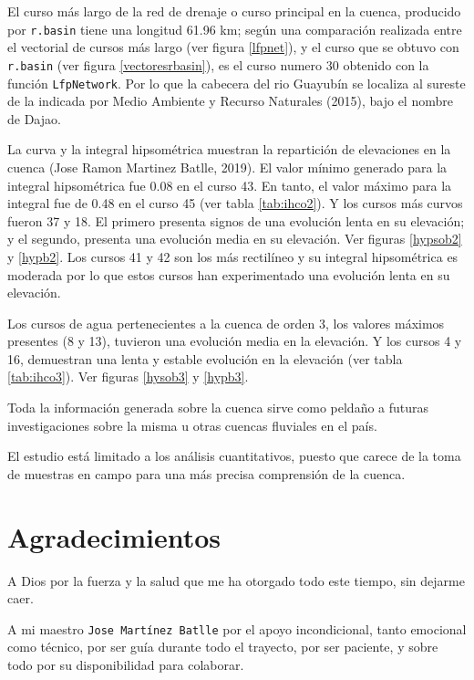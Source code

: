 \documentclass[11pt,]{article}
\begin{document}
El curso más largo de la red de drenaje o curso principal en la cuenca,
producido por \texttt{r.basin} tiene una longitud 61.96 km; según una
comparación realizada entre el vectorial de cursos más largo (ver figura
\ref{lfpnet}), y el curso que se obtuvo con \texttt{r.basin} (ver figura
\ref{vectoresrbasin}), es el curso numero 30 obtenido con la función
\texttt{LfpNetwork}. Por lo que la cabecera del rio Guayubín se localiza
al sureste de la indicada por Medio Ambiente y Recurso Naturales (2015),
bajo el nombre de Dajao.

La curva y la integral hipsométrica muestran la repartición de
elevaciones en la cuenca (Jose Ramon Martinez Batlle, 2019). El valor
mínimo generado para la integral hipsométrica fue 0.08 en el curso 43.
En tanto, el valor máximo para la integral fue de 0.48 en el curso 45
(ver tabla \ref{tab:ihco2}). Y los cursos más curvos fueron 37 y 18. El
primero presenta signos de una evolución lenta en su elevación; y el
segundo, presenta una evolución media en su elevación. Ver figuras
\ref{hypsob2} y \ref{hypb2}. Los cursos 41 y 42 son los más rectilíneo y
su integral hipsométrica es moderada por lo que estos cursos han
experimentado una evolución lenta en su elevación.

Los cursos de agua pertenecientes a la cuenca de orden 3, los valores
máximos presentes (8 y 13), tuvieron una evolución media en la
elevación. Y los cursos 4 y 16, demuestran una lenta y estable evolución
en la elevación (ver tabla \ref{tab:ihco3}). Ver figuras \ref{hysob3} y
\ref{hypb3}.

Toda la información generada sobre la cuenca sirve como peldaño a
futuras investigaciones sobre la misma u otras cuencas fluviales en el
país.

El estudio está limitado a los análisis cuantitativos, puesto que carece
de la toma de muestras en campo para una más precisa comprensión de la
cuenca.

\section{Agradecimientos}\label{agradecimientos}

A Dios por la fuerza y la salud que me ha otorgado todo este tiempo, sin
dejarme caer.

A mi maestro \texttt{Jose\ Martínez\ Batlle} por el apoyo incondicional,
tanto emocional como técnico, por ser guía durante todo el trayecto, por
ser paciente, y sobre todo por su disponibilidad para colaborar.
\end{document}
